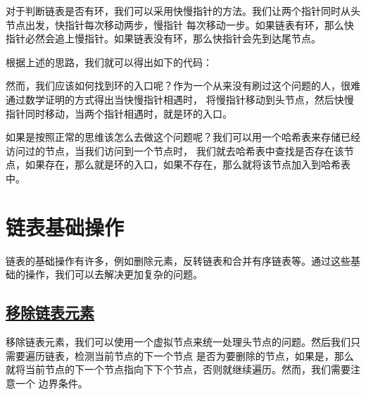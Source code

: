 \documentclass[../../main.tex]{subfiles}
\begin{document}
对于判断链表是否有环，我们可以采用快慢指针的方法。我们让两个指针同时从头节点出发，快指针每次移动两步，慢指针
每次移动一步。如果链表有环，那么快指针必然会追上慢指针。如果链表没有环，那么快指针会先到达尾节点。

根据上述的思路，我们就可以得出如下的代码：



然而，我们应该如何找到环的入口呢？作为一个从来没有刷过这个问题的人，很难通过数学证明的方式得出当快慢指针相遇时，
将慢指针移动到头节点，然后快慢指针同时移动，当两个指针相遇时，就是环的入口。

如果是按照正常的思维该怎么去做这个问题呢？我们可以用一个哈希表来存储已经访问过的节点，当我们访问到一个节点时，
我们就去哈希表中查找是否存在该节点，如果存在，那么就是环的入口，如果不存在，那么就将该节点加入到哈希表中。



\section{链表基础操作}

链表的基础操作有许多，例如删除元素，反转链表和合并有序链表等。通过这些基础的操作，我们可以去解决更加复杂的问题。

\subsection{\href{https://leetcode-cn.com/problems/remove-linked-list-elements/}{移除链表元素}}

移除链表元素，我们可以使用一个虚拟节点来统一处理头节点的问题。然后我们只需要遍历链表，检测当前节点的下一个节点
是否为要删除的节点，如果是，那么就将当前节点的下一个节点指向下下个节点，否则就继续遍历。然而，我们需要注意一个
边界条件。
\end{document}
